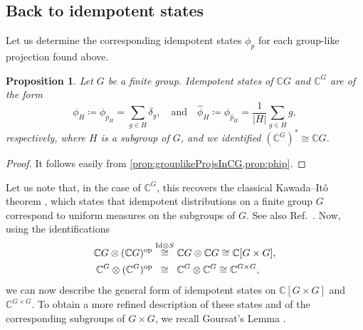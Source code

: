 \documentclass[a4paper,10pt]{amsart}
\newtheorem{proposition}[theorem]{Proposition}
\theoremstyle{definition}
\begin{document}
\subsection{Back to idempotent states}

Let us determine the corresponding idempotent states $\phi_p$ for each group-like projection found above. 

\begin{proposition}
\label{prop:idempotentStatesInCG}
Let $G$ be a finite group.
Idempotent states of $\mathbb{C}G$ and $\mathbb{C}^G$ are of the form
\[
	\phi_H  \coloneqq  \phi_{p_H} = \sum_{g \in H} \delta_g
    ,\quad\text{and}\quad
	\hat{\phi}_H  \coloneqq  \phi_{\hat{p}_H} = \frac{1}{|H|}\sum_{g \in H} g,
\]
respectively, where $H$ is a subgroup of $G$, and we identified $(\mathbb{C}^G)^*\cong \mathbb{C}G$.
\end{proposition}

\begin{proof}
    It follows easily from \cref{prop:grouplikeProjsInCG,prop:phip}.
\end{proof}

Let us note that, in the case of $\mathbb{C}^G$, this recovers the classical Kawada--It\^o theorem \cite{kawada_probability_1940}, which states that idempotent distributions on a finite group $G$ correspond to uniform measures on the subgroups of $G$. See also Ref.~\cite{franz_idempotent_2013}.
Now, using the identifications
\begin{align*}
    \mathbb{C}G \otimes (\mathbb{C}G)^{\mathrm{op}}
    & \overset{\mathrm{Id}\otimes S}{\cong} \mathbb{C}G \otimes \mathbb{C}G
    \cong \mathbb{C}[G \times G],
    \\
    \mathbb{C}^G \otimes (\mathbb{C}^G)^{\mathrm{op}}
    & \overset{\hphantom{\mathrm{Id}\otimes S}}{\cong} \mathbb{C}^G \otimes \mathbb{C}^G
    \cong \mathbb{C}^{G \times G},
\end{align*}
we can now describe the general form of idempotent states on
$\mathbb{C}[G\times G]$ and
$\mathbb{C}^{G\times G}$.
To obtain a more refined description of these states and of the corresponding subgroups of $G \times G$, we recall Goursat's Lemma \cite{goursat_sur_1889}.
\end{document}
